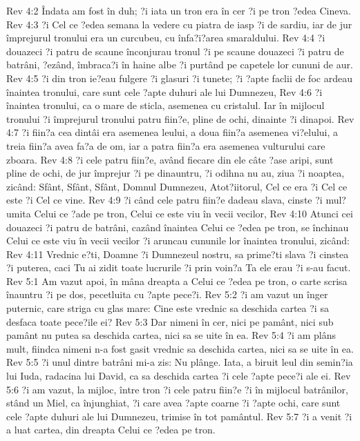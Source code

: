 Rev 4:2  Îndata am fost în duh; ?i iata un tron era în cer ?i pe tron ?edea Cineva.
Rev 4:3  ?i Cel ce ?edea semana la vedere cu piatra de iasp ?i de sardiu, iar de jur împrejurul tronului era un curcubeu, cu înfa?i?area smaraldului.
Rev 4:4  ?i douazeci ?i patru de scaune înconjurau tronul ?i pe scaune douazeci ?i patru de batrâni, ?ezând, îmbraca?i în haine albe ?i purtând pe capetele lor cununi de aur.
Rev 4:5  ?i din tron ie?eau fulgere ?i glasuri ?i tunete; ?i ?apte faclii de foc ardeau înaintea tronului, care sunt cele ?apte duhuri ale lui Dumnezeu,
Rev 4:6  ?i înaintea tronului, ca o mare de sticla, asemenea cu cristalul. Iar în mijlocul tronului ?i împrejurul tronului patru fiin?e, pline de ochi, dinainte ?i dinapoi.
Rev 4:7  ?i fiin?a cea dintâi era asemenea leului, a doua fiin?a asemenea vi?elului, a treia fiin?a avea fa?a de om, iar a patra fiin?a era asemenea vulturului care zboara.
Rev 4:8  ?i cele patru fiin?e, având fiecare din ele câte ?ase aripi, sunt pline de ochi, de jur împrejur ?i pe dinauntru, ?i odihna nu au, ziua ?i noaptea, zicând: Sfânt, Sfânt, Sfânt, Domnul Dumnezeu, Atot?iitorul, Cel ce era ?i Cel ce este ?i Cel ce vine.
Rev 4:9  ?i când cele patru fiin?e dadeau slava, cinste ?i mul?umita Celui ce ?ade pe tron, Celui ce este viu în vecii vecilor,
Rev 4:10  Atunci cei douazeci ?i patru de batrâni, cazând înaintea Celui ce ?edea pe tron, se închinau Celui ce este viu în vecii vecilor ?i aruncau cununile lor înaintea tronului, zicând:
Rev 4:11  Vrednic e?ti, Doamne ?i Dumnezeul nostru, sa prime?ti slava ?i cinstea ?i puterea, caci Tu ai zidit toate lucrurile ?i prin voin?a Ta ele erau ?i s-au facut.
Rev 5:1  Am vazut apoi, în mâna dreapta a Celui ce ?edea pe tron, o carte scrisa înauntru ?i pe dos, pecetluita cu ?apte pece?i.
Rev 5:2  ?i am vazut un înger puternic, care striga cu glas mare: Cine este vrednic sa deschida cartea ?i sa desfaca toate pece?ile ei?
Rev 5:3  Dar nimeni în cer, nici pe pamânt, nici sub pamânt nu putea sa deschida cartea, nici sa se uite în ea.
Rev 5:4  ?i am plâns mult, fiindca nimeni n-a fost gasit vrednic sa deschida cartea, nici sa se uite în ea.
Rev 5:5  ?i unul dintre batrâni mi-a zis: Nu plânge. Iata, a biruit leul din semin?ia lui Iuda, radacina lui David, ca sa deschida cartea ?i cele ?apte pece?i ale ei.
Rev 5:6  ?i am vazut, la mijloc, între tron ?i cele patru fiin?e ?i în mijlocul batrânilor, stând un Miel, ca înjunghiat, ?i care avea ?apte coarne ?i ?apte ochi, care sunt cele ?apte duhuri ale lui Dumnezeu, trimise în tot pamântul.
Rev 5:7  ?i a venit ?i a luat cartea, din dreapta Celui ce ?edea pe tron.
